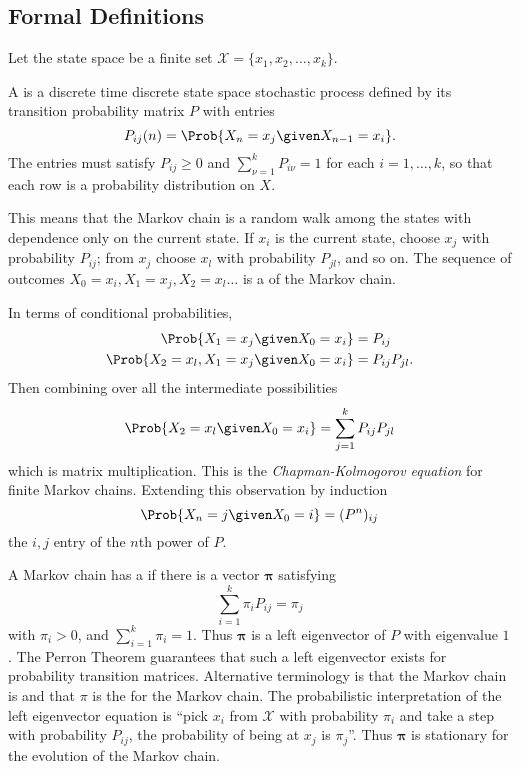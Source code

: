 \documentclass[12pt]{article}
\begin{document}
\subsection*{Formal Definitions}

Let the state space be a finite set \( \mathcal{X}=\{x_1,x_2,\ldots,x_k\}
\).
\begin{definition}
    A  is a discrete time discrete state space
    stochastic process%
    defined by its transition probability matrix \( P \) with entries
    \[
        P_{ij}(n)=\Prob{X_n=x_j \given X_{n-1}=x_i}.
    \] The entries must satisfy \( P_{ij} \ge 0 \) and \( \sum_{\nu=1}^k
    P_ {i \nu} = 1 \) for each \( i=1, \dots, k \), so that each row is
    a probability distribution on \( X \).
\end{definition}

This means that the Markov chain is a random walk among the states with
dependence only on the current state.  If \( x_i \) is the current
state, choose \( x_j \) with probability \( P_{ij} \); from \( x_j \)
choose \( x_l \) with probability \( P_{jl} \), and so on.  The sequence
of outcomes \( X_0 = x_i, X_1 = x_j, X_2 = x_l \dots \) is a  of the Markov chain.%

In terms of conditional probabilities,
\begin{align*}
    \Prob{X_1 = x_j \given X_0 = x_{i}} &= P_{ij} \\
    \Prob{X_2 = x_l, X_1 = x_j \given X_0 = x_i} &= P_{ij}P_{jl}.  \\
\end{align*}
Then combining over all the intermediate possibilities
\[
    \Prob{X_2 = x_l \given X_0 = x_i} = \sum\limits_{j =1}^k P_{ij}P_{jl}
\] which is matrix multiplication.  This is the \textit{Chapman-Kolmogorov
equation} for finite Markov chains.%
Extending this observation by induction
\[
    \Prob{X_n = j \given X_0 = i} = (P^n)_{ij}
\] the \( i,j \) entry of the \( n \)th power of \( P \).

A Markov chain has a  if there is a vector
\( \mathbf{\pi} \) satisfying
\[
    \sum\limits_{i=1}^k \pi_i P_{ij} = \pi_{j}
\] with \( \pi_i > 0 \), and \( \sum_{i=1}^k \pi_i = 1 \).  Thus \(
\mathbf{\pi} \) is a left eigenvector of \( P \) with eigenvalue \( 1 \).
The Perron Theorem guarantees that such a left eigenvector exists for
probability transition matrices. Alternative terminology is that the
Markov chain is  and
that \( \pi \) is the %
for the Markov chain.  The probabilistic interpretation of the left
eigenvector equation is ``pick \( x_i \) from \( \mathcal{X} \) with
probability \( \pi_i \) and take a step with probability \( P_{ij} \),
the probability of being at \( x_j \) is \( \pi_{j} \)''.  Thus \(
\mathbf{\pi} \) is stationary for the evolution of the Markov chain.
\end{document}
